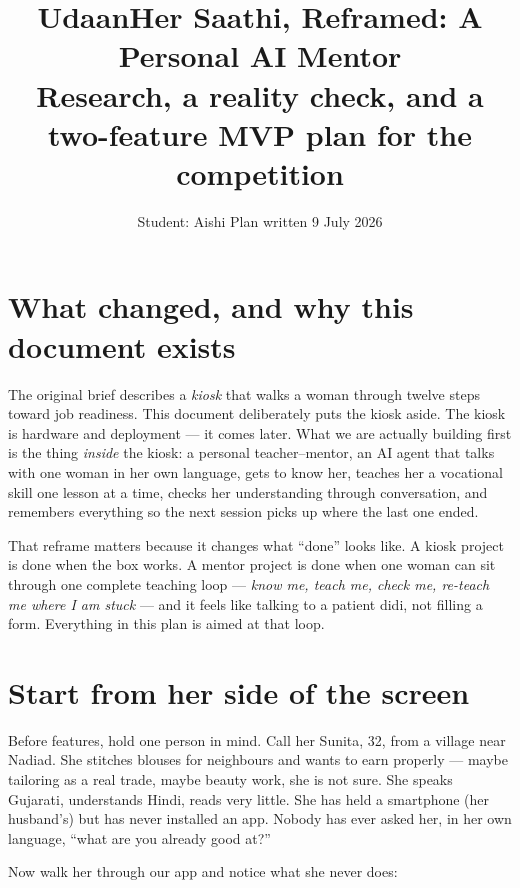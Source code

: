\documentclass[11pt]{article}
\title{\textbf{UdaanHer Saathi, Reframed: A Personal AI Mentor}\\
\large Research, a reality check, and a two-feature MVP plan for the competition}
\author{Student: Aishi \quad\textbullet\quad Plan written 9 July 2026}
\date{}
\begin{document}
\maketitle

\section{What changed, and why this document exists}

The original brief describes a \emph{kiosk} that walks a woman through twelve steps toward job readiness. This document deliberately puts the kiosk aside. The kiosk is hardware and deployment --- it comes later. What we are actually building first is the thing \emph{inside} the kiosk: a personal teacher--mentor, an AI agent that talks with one woman in her own language, gets to know her, teaches her a vocational skill one lesson at a time, checks her understanding through conversation, and remembers everything so the next session picks up where the last one ended.

That reframe matters because it changes what ``done'' looks like. A kiosk project is done when the box works. A mentor project is done when one woman can sit through one complete teaching loop --- \emph{know me, teach me, check me, re-teach me where I am stuck} --- and it feels like talking to a patient didi, not filling a form. Everything in this plan is aimed at that loop.

\section{Start from her side of the screen}

Before features, hold one person in mind. Call her Sunita, 32, from a village near Nadiad. She stitches blouses for neighbours and wants to earn properly --- maybe tailoring as a real trade, maybe beauty work, she is not sure. She speaks Gujarati, understands Hindi, reads very little. She has held a smartphone (her husband's) but has never installed an app. Nobody has ever asked her, in her own language, ``what are you already good at?''

Now walk her through our app and notice what she never does:
\end{document}
